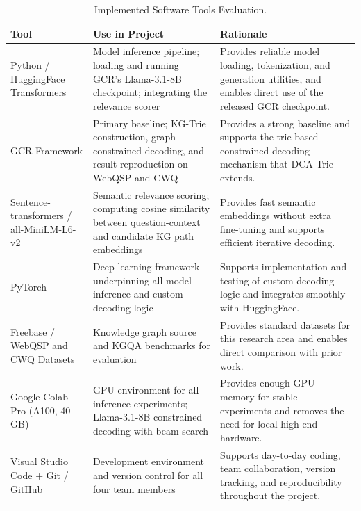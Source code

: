 \begin{table}[H]
  \centering
  \small
  \setlength{\tabcolsep}{4pt}
  \caption[Implemented Software Tools Evaluation]{Implemented Software Tools Evaluation.}
  \label{tab:implemented-software-tools}
  \begin{tabularx}{\textwidth}{|>{\raggedright\arraybackslash}p{}|>{\raggedright\arraybackslash}p{}|>{\raggedright\arraybackslash}X|}
    \hline
    Tool                                     & Use in Project                                                                                                    & Rationale                                                                                                                       \\
    \hline
    Python / HuggingFace Transformers        & Model inference pipeline; loading and running GCR's Llama-3.1-8B checkpoint; integrating the relevance scorer     & Provides reliable model loading, tokenization, and generation utilities, and enables direct use of the released GCR checkpoint. \\
    \hline
    GCR Framework                            & Primary baseline; KG-Trie construction, graph-constrained decoding, and result reproduction on WebQSP and CWQ     & Provides a strong baseline and supports the trie-based constrained decoding mechanism that DCA-Trie extends.                    \\
    \hline
    Sentence-transformers / all-MiniLM-L6-v2 & Semantic relevance scoring; computing cosine similarity between question-context and candidate KG path embeddings & Provides fast semantic embeddings without extra fine-tuning and supports efficient iterative decoding.                          \\
    \hline
    PyTorch                                  & Deep learning framework underpinning all model inference and custom decoding logic                                & Supports implementation and testing of custom decoding logic and integrates smoothly with HuggingFace.                          \\
    \hline
    Freebase / WebQSP and CWQ Datasets       & Knowledge graph source and KGQA benchmarks for evaluation                                                         & Provides standard datasets for this research area and enables direct comparison with prior work.                                \\
    \hline
    Google Colab Pro (A100, 40 GB)           & GPU environment for all inference experiments; Llama-3.1-8B constrained decoding with beam search                 & Provides enough GPU memory for stable experiments and removes the need for local high-end hardware.                             \\
    \hline
    Visual Studio Code + Git / GitHub        & Development environment and version control for all four team members                                             & Supports day-to-day coding, team collaboration, version tracking, and reproducibility throughout the project.                   \\
    \hline
  \end{tabularx}
\end{table}


